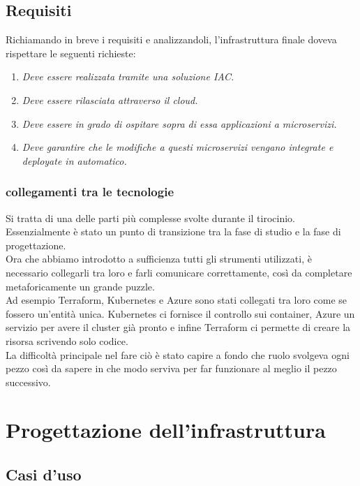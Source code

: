 \documentclass[a4paper,12pt]{report}
\begin{document}
\section{Requisiti}
Richiamando in breve i requisiti e analizzandoli, l'infrastruttura finale doveva rispettare le seguenti richieste:\\
\begin{enumerate}
\item \textit{Deve essere realizzata tramite una soluzione IAC.}
\item \textit{Deve essere rilasciata attraverso il cloud.}
\item \textit{Deve essere in grado di ospitare sopra di essa applicazioni a microservizi.}
\item \textit{Deve garantire che le modifiche a questi microservizi vengano integrate e deployate in automatico. }
\end{enumerate}
\subsection{collegamenti tra le tecnologie}
Si tratta di una delle parti più complesse svolte durante il tirocinio. Essenzialmente è stato un punto di transizione tra la fase di studio e la fase di progettazione.\\
Ora che abbiamo introdotto a sufficienza tutti gli strumenti utilizzati, è necessario collegarli tra loro e farli comunicare correttamente, così da completare metaforicamente un grande puzzle.\\
Ad esempio Terraform, Kubernetes e Azure sono stati collegati tra loro come se fossero un'entità unica. Kubernetes ci fornisce il controllo sui container, Azure un servizio per avere il cluster già pronto e infine Terraform ci permette di creare la risorsa scrivendo solo codice. \\
La difficoltà principale nel fare ciò è stato capire a fondo che ruolo svolgeva ogni pezzo così da sapere in che modo serviva per far funzionare al meglio il pezzo successivo.

\chapter{Progettazione dell'infrastruttura}
\section{Casi d'uso}
\end{document}

